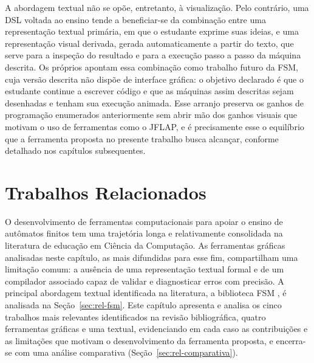 \documentclass[
    12pt
    ,oneside
    ,a4paper
    ,chapter=TITLE
    ,section=TITLE
    ,sumario=abnt-6027-2012]{abntex2}
\begin{document}
A abordagem textual não se opõe, entretanto, à visualização. Pelo contrário, uma DSL voltada ao
ensino tende a beneficiar-se da combinação entre uma representação textual primária, em que o
estudante exprime suas ideias, e uma representação visual derivada, gerada automaticamente a
partir do texto, que serve para a inspeção do resultado e para a execução passo a passo da
máquina descrita. Os próprios  apontam essa combinação como trabalho
futuro da FSM, cuja versão descrita não dispõe de interface gráfica: o objetivo declarado é
que o estudante continue a escrever código e que as máquinas assim descritas sejam
desenhadas e tenham sua execução animada. Esse arranjo preserva os ganhos de programação
enumerados anteriormente sem
abrir mão dos ganhos visuais que motivam o uso de ferramentas como o JFLAP, e é precisamente
esse o equilíbrio que a ferramenta proposta no presente trabalho busca alcançar, conforme
detalhado nos capítulos subsequentes.

\chapter{Trabalhos Relacionados}
\label{cap:relacionados}

O desenvolvimento de ferramentas computacionais para apoiar o ensino de autômatos finitos tem
uma trajetória longa e relativamente consolidada na literatura de educação em Ciência da
Computação. As ferramentas gráficas analisadas neste capítulo, as mais difundidas para esse
fim, compartilham uma limitação comum: a ausência de uma representação textual formal e de um
compilador associado capaz de validar e diagnosticar erros com precisão. A principal abordagem
textual identificada na literatura, a biblioteca FSM \cite{morazan2014}, é analisada na
Seção~\ref{sec:rel-fsm}. Este capítulo apresenta e analisa os cinco trabalhos mais relevantes
identificados na revisão bibliográfica, quatro ferramentas gráficas e uma textual, evidenciando
em cada caso as contribuições e as limitações que motivam o desenvolvimento da ferramenta
proposta, e encerra-se com uma análise comparativa (Seção~\ref{sec:rel-comparativa}).
\end{document}
